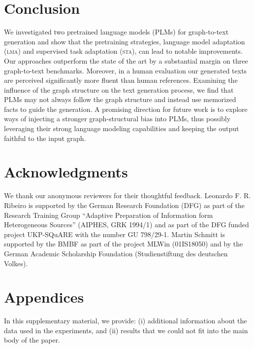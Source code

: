 \documentclass[11pt]{article}
\begin{document}
\section{Conclusion}

We investigated two pretrained language models (PLMs) for graph-to-text generation and show that the pretraining strategies, language model adaptation (\textsc{lma}) and supervised task adaptation (\textsc{sta}), can lead to notable improvements. Our approaches outperform the state of the art by a substantial margin on three graph-to-text benchmarks. Moreover, in a human evaluation our generated texts are perceived significantly more fluent than human references. Examining the influence of the graph structure on the text generation process, we find that PLMs may not always follow the graph structure and instead use memorized facts to guide the generation. A promising direction for future work is to explore ways of injecting a stronger graph-structural bias into PLMs, thus possibly leveraging their strong language modeling capabilities and keeping the output faithful to the input graph.


\section*{Acknowledgments}
We thank our anonymous reviewers for their thoughtful feedback. Leonardo F. R. Ribeiro is supported by the German Research Foundation (DFG) as part of the Research Training Group ``Adaptive Preparation of Information form Heterogeneous Sources'' (AIPHES, GRK 1994/1) and as part of the DFG funded project UKP-SQuARE with the number GU 798/29-1. Martin Schmitt is supported by the BMBF as part of the project MLWin (01IS18050) and by the German Academic Scholarship Foundation (Studienstiftung des deutschen Volkes).







\clearpage

\appendix

\section*{Appendices}

In this supplementary material, we provide: (i) additional information about the data used in the experiments, and (ii) results that we could not fit into the main body of the paper.
\end{document}
